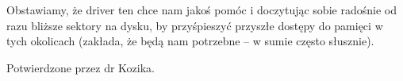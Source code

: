 Obstawiamy, że driver ten chce nam jakoś pomóc i doczytując sobie radośnie od razu bliższe sektory na dysku, by przyśpieszyć przyszłe dostępy do pamięci w tych okolicach (zakłada, że będą nam potrzebne -- w sumie często słusznie). 

Potwierdzone przez dr Kozika. 